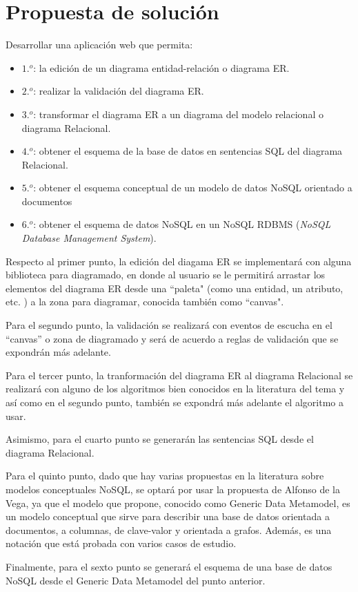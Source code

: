 \section{Propuesta de solución}

Desarrollar una aplicación web que permita:

\begin{itemize}
    \item $1.^{o}$: la edición de un diagrama entidad-relación o diagrama ER.
    \item $2.^{o}$: realizar la validación del diagrama ER.
    \item $3.^{o}$: transformar el diagrama ER a un diagrama del modelo relacional o diagrama Relacional.
    \item $4.^{o}$: obtener el esquema de la base de datos en sentencias SQL del diagrama Relacional.
    \item $5.^{o}$: obtener el esquema conceptual de un modelo de datos NoSQL orientado a documentos
    \item $6.^{o}$: obtener el esquema de datos NoSQL en un NoSQL RDBMS (\textit{NoSQL Database Management System}).
\end{itemize}

Respecto al primer punto, la edición del diagama ER se implementará con alguna biblioteca para diagramado, en donde al usuario se le permitirá arrastar los elementos del diagrama ER desde una ``paleta" (como una entidad, un atributo, etc. ) a la zona para diagramar, conocida también como ``canvas".


Para el segundo punto, la validación se realizará con eventos de escucha en el ``canvas'' o zona de diagramado y será de acuerdo a reglas de validación que se expondrán más adelante.


Para el tercer punto, la tranformación del diagrama ER al diagrama Relacional se realizará con alguno de los algoritmos bien conocidos en la literatura del tema y así como en el segundo punto, también se expondrá más adelante el algoritmo a usar.


Asimismo, para el cuarto punto se generarán las sentencias SQL desde el diagrama Relacional.


Para el quinto punto, dado que hay varias propuestas en la literatura sobre modelos conceptuales NoSQL, se optará por usar la propuesta de Alfonso de la Vega\cite{de_la_vega_mortadelo_2020}, ya que el modelo que propone, conocido como Generic Data Metamodel, es un modelo conceptual que sirve para describir una base de datos orientada a documentos, a columnas, de clave-valor y orientada a grafos. Además, es una notación que está probada con varios casos de estudio.


Finalmente, para el sexto punto se generará el esquema de una base de datos NoSQL desde el Generic Data Metamodel del punto anterior.